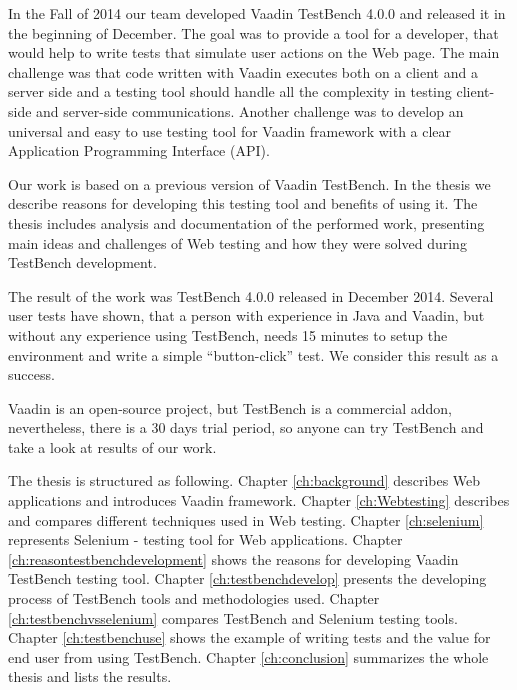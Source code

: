	 In the Fall of 2014 our team developed Vaadin TestBench
	 4.0.0 and released it in the beginning of December. The goal was to provide a
	 tool for a developer, that would help to write tests that simulate user
	 actions on the Web page. The main challenge was that code written with Vaadin
	 executes both on a client and a server side and a testing tool should handle
	 all the complexity in testing client-side and server-side communications. Another challenge was
	 to develop an universal and easy to use testing tool for Vaadin framework with a
	 clear Application Programming Interface (API).
	 
	 Our work is based on a previous version of Vaadin TestBench. In the thesis
	 we describe reasons for developing this testing tool and benefits of using it.
	 The thesis includes analysis and documentation of the performed work,
	 presenting main ideas and challenges of Web testing and how they were
	 solved during TestBench development.
	 
	 The result of the work was TestBench 4.0.0 released in December 2014.
	 Several user tests have shown, that a person with experience in Java and
	 Vaadin, but without any experience using TestBench, needs 15 minutes to setup
	 the environment and write a simple ``button-click'' test. We consider this
	 result as a success.
	  
	 Vaadin is an open-source project, but TestBench is a commercial
	 addon, nevertheless, there is a 30 days trial period, so anyone
	 can try TestBench and take a look at results of our work.
	  

	  The thesis is structured as following. Chapter \ref{ch:background} describes
	  Web applications and introduces Vaadin framework. Chapter \ref{ch:Webtesting}
	  describes and compares different techniques used in Web testing. Chapter
	  \ref{ch:selenium} represents Selenium - testing tool for Web applications.
	  Chapter \ref{ch:reasontestbenchdevelopment} shows the reasons for
	  developing Vaadin TestBench testing tool. Chapter \ref{ch:testbenchdevelop} presents the developing process of TestBench tools and methodologies used.
	  Chapter \ref{ch:testbenchvsselenium} compares TestBench and Selenium testing
	  tools. Chapter \ref{ch:testbenchuse} shows the example of writing tests and
	  the value for end user from using TestBench. 
	  Chapter \ref{ch:conclusion} summarizes the whole thesis and lists the
	  results.
